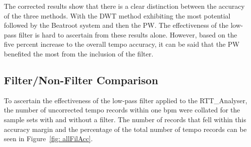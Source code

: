 \documentclass[a4paper, 11pt]{article}
\begin{document}
The corrected results show that there is a clear distinction between the accuracy of the three methods. With the DWT method exhibiting the most potential followed by the Beatroot system and then the PW. The effectiveness of the low-pass filter is hard to ascertain from these results alone. However, based on the five percent increase to the overall tempo accuracy, it can be said that the PW benefited the most from the inclusion of the filter.

\subsection{Filter/Non-Filter Comparison}
To ascertain the effectiveness of the low-pass filter applied to the RTT\_Analyser, the number of uncorrected tempo records within one bpm were collated for the sample sets with and without a filter. The number of records that fell within this accuracy margin and the percentage of the total number of tempo records can be seen in Figure~\ref{fig: allFilAcc}. 
\end{document}
